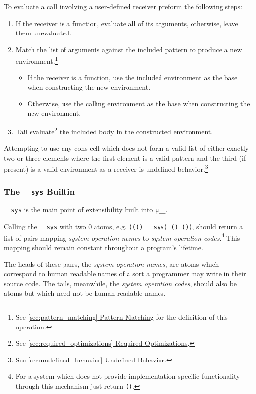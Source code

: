 \documentclass[twocolumn]{report}
\newcommand\muu{\texttt{μ\!\!\!\_\_}}
\newcommand{\intralink}[2]{\hyperref[#1]{\ref*{#1} #2}}
\begin{document}
To evaluate a call involving a user-defined receiver preform the following steps:
\begin{enumerate}
\item If the receiver is a function, evaluate all of its arguments, otherwise, leave them unevaluated.
\item Match the list of arguments against the included pattern to produce a new environment.\footnote{See \intralink{sec:pattern_matching}{Pattern Matching} for the definition of this operation.}
\begin{itemize}
\item If the receiver is a function, use the included environment as the base when constructing the new environment.
\item Otherwise, use the calling environment as the base when constructing the new environment.
\end{itemize}
\item Tail evaluate\footnote{See \intralink{sec:required_optimizations}{Required Optimizations}.} the included body in the constructed environment.
\end{enumerate}

Attempting to use any cons-cell which does not form a valid list of either exactly two or three elements where the first element is a valid pattern and the third (if present) is a valid environment as a receiver is undefined behavior.\footnote{See \intralink{sec:undefined_behavior}{Undefined Behavior}.}

\subsubsection{The \texttt{~~sys} Builtin}
\label{subsubsec:system_builtin}

\texttt{~~sys} is the main point of extensibility built into \muu.

Calling the \texttt{~~sys} with two $0$ atoms, e.g. \texttt{((() ~~sys) () ())}, should return a list of pairs mapping \emph{system operation names} to \emph{system operation codes}.\footnote{For a system which does not provide implementation specific functionality through this mechanism just return \texttt{()}.}
This mapping should remain constant throughout a program's lifetime.

The heads of these pairs, the \emph{system operation names}, are atoms which correspond to human readable names of a sort a programmer may write in their source code.
The tails, meanwhile, the \emph{system operation codes}, should also be atoms but which need not be human readable names.
\end{document}

